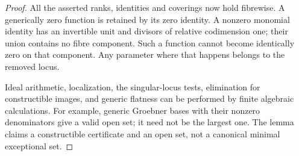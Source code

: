 \begin{proof}
All the asserted ranks, identities and coverings now hold fibrewise.
A generically zero function is retained by its zero identity. A nonzero
monomial identity has an invertible unit and divisors of relative
codimension one; their union contains no fibre component. Such a
function cannot become identically zero on that component. Any parameter
where that happens belongs to the removed locus.

Ideal arithmetic, localization, the singular-locus tests, elimination
for constructible images, and generic flatness can be performed by finite
algebraic calculations. For example, generic Groebner bases with their
nonzero denominators give a valid open set; it need not be the largest
one. The lemma claims a constructible certificate and an open set, not
a canonical minimal exceptional set.
\end{proof}

